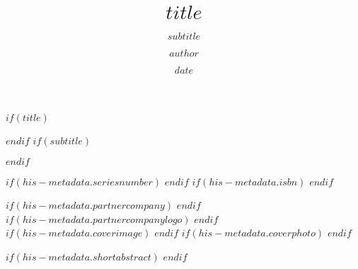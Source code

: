 $if(title)$
\title{$title$}
$endif$
$if(subtitle)$
\subtitle{$subtitle$}
$endif$
\author{$author$}
\date{$date$} %
$if(his-metadata.seriesnumber)$
$endif$
$if(his-metadata.isbn)$
$endif$


$if(his-metadata.partnercompany)$
$endif$
$if(his-metadata.partnercompanylogo)$
$endif$
$if(his-metadata.coverimage)$
$endif$
$if(his-metadata.coverphoto)$
$endif$

$if(his-metadata.shortabstract)$
$endif$